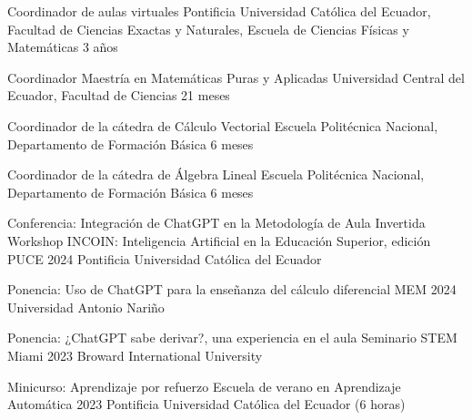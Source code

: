 \documentclass[
	a4paper,
	maincolor=cvblue!70!blue,
	sidecolor=gray!30,
	sectioncolor=cvblue!70!blue,
    sidebarwidth=7.5cm,
	topbottommargin=20pt,
	leftrightmargin=20pt,
]{fortysecondscv}
\begin{document}
    {Coordinador de aulas virtuales}
    {Pontificia Universidad Católica del Ecuador, Facultad de Ciencias Exactas y Naturales, Escuela de Ciencias Físicas y Matemáticas}
    {3 años}
    
    {Coordinador Maestría en Matemáticas Puras y Aplicadas}
    {Universidad Central del Ecuador, Facultad de Ciencias}
    {21 meses}
    
    {Coordinador de la cátedra de Cálculo Vectorial}
    {Escuela Politécnica Nacional, Departamento de Formación Básica}
    {6 meses}
    
    {Coordinador de la cátedra de Álgebra Lineal}
    {Escuela Politécnica Nacional, Departamento de Formación Básica}
    {6 meses}
    



\newpage
{}



    {Conferencia: Integración de ChatGPT en la Metodología de Aula Invertida}
    {Workshop INCOIN: Inteligencia Artificial en la Educación Superior, edición PUCE 2024}
    {Pontificia Universidad Católica del Ecuador}
    
    {Ponencia: Uso de ChatGPT para la enseñanza del cálculo diferencial}
    {MEM 2024}
    {Universidad Antonio Nariño}
    
    {Ponencia: ¿ChatGPT sabe derivar?, una experiencia en el aula}
    {Seminario STEM Miami 2023}
    {Broward International University}
    
    
    {Minicurso: Aprendizaje por refuerzo}
    {Escuela de verano en Aprendizaje Automática 2023}
    {Pontificia Universidad Católica del Ecuador (6 horas)}
    
\end{document}
